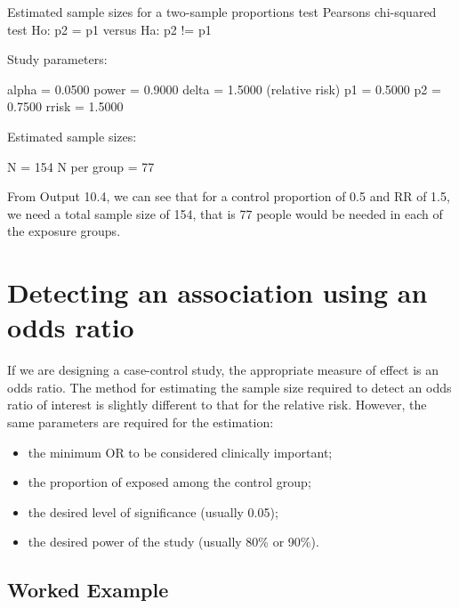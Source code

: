 \documentclass[
]{memoir}
\newenvironment{Shaded}{\begin{snugshade}}{\end{snugshade}}
\newcommand{\NormalTok}[1]{#1}
\providecommand{\tightlist}{%
  \setlength{\itemsep}{0pt}\setlength{\parskip}{0pt}}
\begin{document}
\begin{Shaded}
\begin{Highlighting}[]
\NormalTok{Estimated sample sizes for a two{-}sample proportions test}
\NormalTok{Pearson\textquotesingle{}s chi{-}squared test }
\NormalTok{Ho: p2 = p1  versus  Ha: p2 != p1}

\NormalTok{Study parameters:}

\NormalTok{        alpha =    0.0500}
\NormalTok{        power =    0.9000}
\NormalTok{        delta =    1.5000  (relative risk)}
\NormalTok{           p1 =    0.5000}
\NormalTok{           p2 =    0.7500}
\NormalTok{        rrisk =    1.5000}

\NormalTok{Estimated sample sizes:}

\NormalTok{            N =       154}
\NormalTok{  N per group =        77}
\end{Highlighting}
\end{Shaded}

From Output 10.4, we can see that for a control proportion of 0.5 and RR of 1.5, we need a total sample size of 154, that is 77 people would be needed in each of the exposure groups.

\hypertarget{detecting-an-association-using-an-odds-ratio}{%
\section{Detecting an association using an odds ratio}\label{detecting-an-association-using-an-odds-ratio}}

If we are designing a case-control study, the appropriate measure of effect is an odds ratio. The method for estimating the sample size required to detect an odds ratio of interest is slightly different to that for the relative risk. However, the same parameters are required for the estimation:

\begin{itemize}
\tightlist
\item
  the minimum OR to be considered clinically important;
\item
  the proportion of exposed among the control group;
\item
  the desired level of significance (usually 0.05);
\item
  the desired power of the study (usually 80\% or 90\%).
\end{itemize}

\hypertarget{wex10-5}{%
\subsection{Worked Example}\label{wex10-5}}
\end{document}
